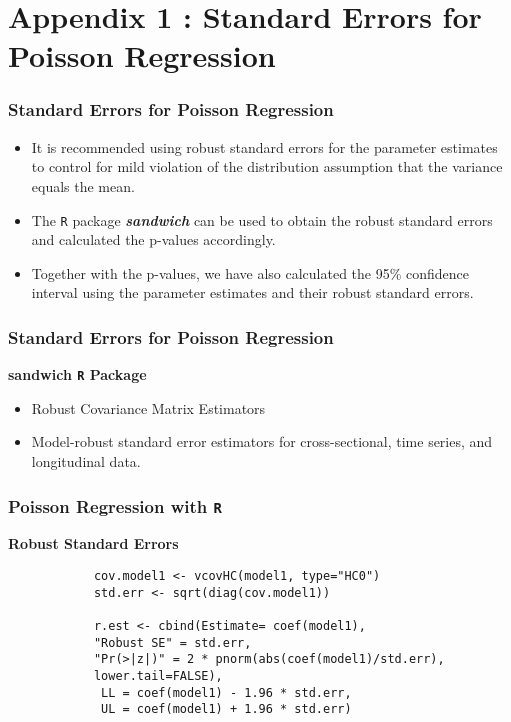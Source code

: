 \documentclass[00-GLMregslides.tex]{subfiles}
\begin{document}
\section*{Appendix 1 : Standard Errors for Poisson Regression}
	\begin{frame}[fragile]
		
		\frametitle{Standard Errors for Poisson Regression}
		\large 
	
		\begin{itemize}
			\item It is recommended using robust standard errors for the parameter estimates to control for mild violation of the distribution assumption that the variance equals the mean. 
			\item The \texttt{R} package \textbf{\textit{sandwich}} can be used to obtain the robust standard errors and calculated the p-values accordingly. 
			\item Together with the p-values, we have also calculated the 95\% confidence interval using the parameter estimates and their robust standard errors. 
		\end{itemize}
	\end{frame}
	
	\begin{frame}[fragile]
		
		\frametitle{Standard Errors for Poisson Regression}
		\large
		\textbf{sandwich \texttt{R} Package }
		\begin{itemize}
			\item Robust Covariance Matrix Estimators
			
			\item Model-robust standard error estimators for cross-sectional, time series, and longitudinal data.
			
		\end{itemize}
	\end{frame}
	
	\begin{frame}[fragile]
		
		\frametitle{Poisson Regression with \texttt{R}}
		\large
		\textbf{Robust Standard Errors}
		\begin{framed}
			\begin{verbatim}
			cov.model1 <- vcovHC(model1, type="HC0")
			std.err <- sqrt(diag(cov.model1))
			
			r.est <- cbind(Estimate= coef(model1), 
			"Robust SE" = std.err,
			"Pr(>|z|)" = 2 * pnorm(abs(coef(model1)/std.err), 
			lower.tail=FALSE),
			 LL = coef(model1) - 1.96 * std.err,
			 UL = coef(model1) + 1.96 * std.err)
			
			\end{verbatim}
		\end{framed}
	\end{frame}
	
\end{document}
